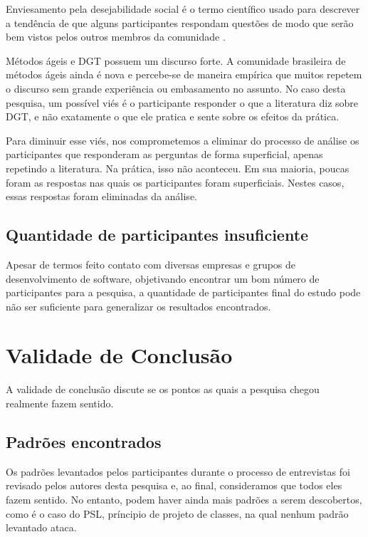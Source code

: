 Enviesamento pela desejabilidade social é o termo científico usado para descrever
a tendência de que alguns participantes respondam questões de modo que serão
bem vistos pelos outros membros da comunidade \cite{crowne}.

Métodos ágeis e DGT possuem um discurso forte. A comunidade brasileira de métodos
ágeis ainda é nova e percebe-se de maneira empírica que muitos repetem o discurso
sem grande experiência ou embasamento no assunto.
No caso desta pesquisa, um possível viés é o participante responder o que
a literatura diz sobre DGT, e não exatamente o que ele pratica e sente sobre
os efeitos da prática. 

Para diminuir esse viés, nos comprometemos a eliminar do processo de análise os participantes
que responderam as perguntas de forma superficial, apenas repetindo a literatura. Na prática,
isso não aconteceu. Em sua maioria, poucas foram as respostas nas quais os participantes
foram superficiais. Nestes casos, essas respostas foram eliminadas da análise.

\subsection{Quantidade de participantes insuficiente}

Apesar de termos feito contato
com diversas empresas e grupos de desenvolvimento de software,
objetivando encontrar um bom número de participantes para a pesquisa,
a quantidade de participantes final do estudo pode não ser suficiente para generalizar
os resultados encontrados. 

\section{Validade de Conclusão}

A validade de conclusão discute se os pontos as quais a pesquisa chegou realmente
fazem sentido.

\subsection{Padrões encontrados}

Os padrões levantados pelos participantes durante o processo de entrevistas
foi revisado pelos autores desta pesquisa e, ao final, consideramos que todos
eles fazem sentido.
No entanto, podem haver ainda mais padrões a serem descobertos, como é o caso
do PSL, príncipio de projeto de classes, na qual nenhum padrão levantado
ataca.

